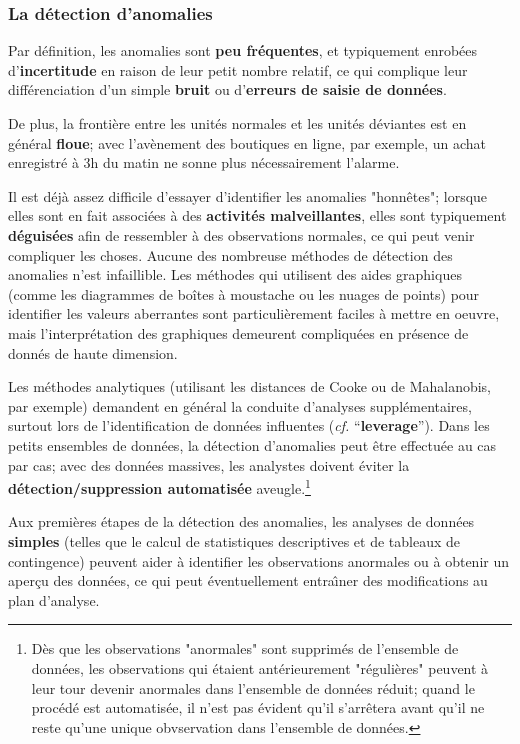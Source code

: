 \subsubsection*{La d\'etection d'anomalies}  Par d\'efinition, les anomalies sont \textbf{peu fréquentes}, et typiquement enrob\'ees d'\textbf{incertitude} en raison de leur petit nombre relatif, ce qui complique leur  différenciation d'un simple \textbf{bruit} ou d'\textbf{erreurs de saisie de donn\'ees}. \par De plus, la fronti\`ere entre les unités normales et les unités déviantes est en g\'en\'eral \textbf{floue}; avec l'avènement des boutiques en ligne, par exemple, un achat enregistr\'e à 3h du matin ne sonne plus nécessairement l'alarme. \par Il est déjà assez difficile d'essayer d'identifier les anomalies "honnêtes"; lorsque elles sont en fait associées à des \textbf{activités malveillantes}, elles sont typiquement \textbf{déguisées} afin de ressembler à des ob\-ser\-va\-tions normales, ce qui peut venir compliquer les choses.  
\newl
Aucune des nombreuse m\'ethodes de d\'etection des ano\-malies n'est infaillible. Les méthodes qui utilisent des aides graphiques (comme les diagrammes de boîtes \`a moustache ou les nuages de points) pour identifier les valeurs aberrantes sont particulièrement faciles à mettre en oeuvre, mais l'interpr\'etation des graphiques demeurent compliqu\'ees en pr\'esence de donn\'es de haute dimension. \par Les méthodes analytiques (utilisant les distances de Cooke ou de Mahalanobis, par exemple) demandent en g\'en\'eral la conduite d'analyses supplémentaires, surtout lors de l'identification de donn\'ees influentes (\textit{cf.} ``\textbf{leverage}''). 
\newl Dans les petits ensembles de données, la détection d'ano\-ma\-lies peut être effectuée au cas par cas; avec des donn\'ees massives, les analystes doivent \'eviter la \textbf{détection/suppression automatisée} aveugle.\footnote{D\`es que les ob\-ser\-va\-tions "anormales" sont supprim\'es de l'ensemble de données, les ob\-ser\-va\-tions qui \'etaient ant\'erieurement "régulières" peuvent à leur tour devenir anormales dans l'ensemble de données r\'eduit; quand le proc\'ed\'e est automatis\'ee, il n'est pas \'evident qu'il s'arr\^etera avant qu'il ne reste  qu'une unique obvservation dans l'ensemble de donn\'ees.}\par
Aux premières \'etapes de la détection des anomalies, les analyses de donn\'ees \textbf{simples} (telles que le calcul de statistiques descriptives et de tableaux de contingence) peuvent aider  à identifier les ob\-ser\-va\-tions anormales ou \`a  obtenir un aperçu des données, ce qui peut éventuellement entra\^{\i}ner des modifications au plan d'analyse.
